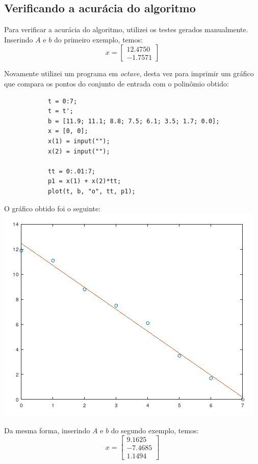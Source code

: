 \documentclass[a4paper,11pt]{article}
\begin{document}
        
    \subsection{Verificando a acurácia do algoritmo}
        Para verificar a acurácia do algoritmo, utilizei os testes gerados manualmente. Inserindo $A$ e $b$ do primeiro exemplo, temos:
        $$
            x =
            \begin{bmatrix}
                12.4750 \\
                -1.7571
            \end{bmatrix}
        $$
        
        Novamente utilizei um programa em \textit{octave}, desta vez para imprimir um gráfico que compara os pontos do conjunto de entrada com o polinômio obtido:
        \begin{lstlisting}
            t = 0:7;
            t = t';
            b = [11.9; 11.1; 8.8; 7.5; 6.1; 3.5; 1.7; 0.0];
            x = [0, 0];
            x(1) = input("");
            x(2) = input("");
            
            tt = 0:.01:7;
            p1 = x(1) + x(2)*tt;
            plot(t, b, "o", tt, p1);
        \end{lstlisting}
        
        O gráfico obtido foi o seguinte: \\
        \includegraphics[scale=0.7]{pol1}
        
        Da mesma forma, inserindo $A$ e $b$ do segundo exemplo, temos:
        $$
            x =
            \begin{bmatrix}
                9.1625 \\
                -7.4685 \\
                1.1494
            \end{bmatrix}
        $$
        
\end{document}
